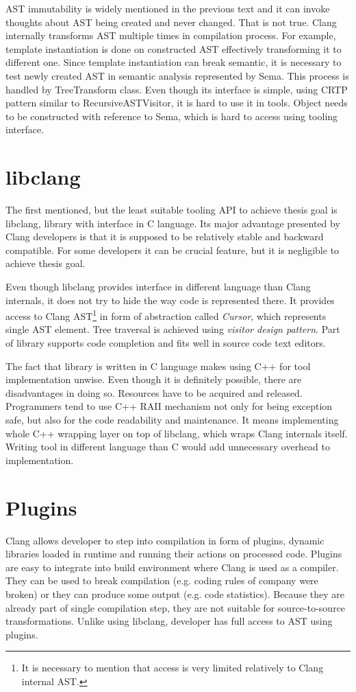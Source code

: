 AST immutability is widely mentioned in the previous text and it can invoke thoughts about AST being created and never changed. That is not true. Clang internally transforms AST multiple times in compilation process. For example, template instantiation is done on constructed AST effectively transforming it to different one. Since template instantiation can break semantic, it is necessary to test newly created AST in semantic analysis represented by Sema. This process is handled by TreeTransform class. Even though its interface is simple, using CRTP pattern similar to RecursiveASTVisitor, it is hard to use it in tools. Object needs to be constructed with reference to Sema, which is hard to access using tooling interface. 

\section{libclang}
The first mentioned, but the least suitable tooling API to achieve thesis goal is libclang, library with interface in C language. Its major advantage presented by Clang developers is that it is supposed to be relatively stable and backward compatible. For some developers it can be crucial feature, but it is negligible to achieve thesis goal.

Even though libclang provides interface in different language than Clang internals, it does not try to hide the way code is represented there. It provides access to Clang AST\footnote{It is necessary to mention that access is very limited relatively to Clang internal AST.} in form of abstraction called \emph{Cursor}, which represents single AST element. Tree traversal is achieved using \emph{visitor design pattern}. Part of library supports code completion and fits well in source code text editors.

The fact that library is written in C language makes using C++ for tool implementation unwise. Even though it is definitely possible, there are disadvantages in doing so. Resources have to be acquired and released. Programmers tend to use C++ RAII mechanism not only for being exception safe, but also for the code readability and maintenance. It means implementing whole C++ wrapping layer on top of libclang, which wraps Clang internals itself. Writing tool in different language than C would add unnecessary overhead to implementation. 

\section{Plugins}
Clang allows developer to step into compilation in form of plugins, dynamic libraries loaded in runtime and running their actions on processed code. Plugins are easy to integrate into build environment where Clang is used as a compiler. They can be used to break compilation (e.g.  coding rules of company were broken) or they can produce some output (e.g. code statistics). Because they are already part of single compilation step, they are not suitable for source-to-source transformations. Unlike using libclang, developer has full access to AST using plugins.

